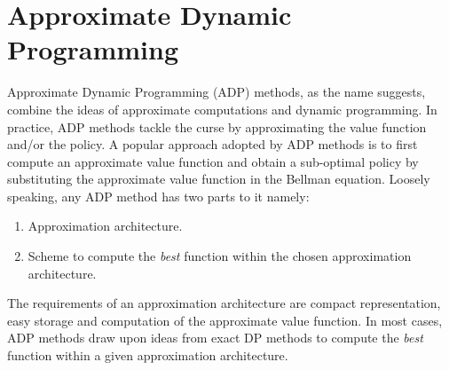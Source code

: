\section{Approximate Dynamic Programming}
Approximate Dynamic Programming (ADP) methods, as the name suggests, combine the ideas of approximate computations and dynamic programming. In practice, ADP methods tackle the curse by approximating the value function and/or the policy. A popular approach adopted by ADP methods is to first compute an approximate value function and obtain a sub-optimal policy by substituting the approximate value function in the Bellman equation. Loosely speaking, any ADP method has two parts to it namely:
\begin{enumerate}
\item Approximation architecture.
\item Scheme to compute the \emph{best} function within the chosen approximation architecture.
\end{enumerate}
The requirements of an approximation architecture are compact representation, easy storage and computation of the approximate value function. In most cases, ADP methods draw upon ideas from exact DP methods to compute the \emph{best} function within a given approximation architecture.\par
\begin{comment}
\begin{enumerate}
\item Approximation architecture.
\item Scheme to compute the right function within the chosen approximation architecture.
\end{enumerate}
In most cases, ADP methods are obtained by combining exact DP methods with a given approximation architecture. A given ADP scheme can be said to belong to either of two approaches based on the way the prediction and the control problems are addressed. The two distinct approaches are:
\begin{enumerate}
\item The \emph{value function} based approach, wherein a direct approximation to the optimal value function is obtained and a \emph{greedy/sub-optimal} policy is computed by substituing the approximate value function in the Bellman equation.
\item The \emph{approximate policy iteration} based approach, wherein, the critic evaluates the current policy, i.e., computes an approximation of the value function of the current policy. The actor on the other hand, makes use of the approximate value function to imporve the current policy.
\end{enumerate}
\end{comment}
